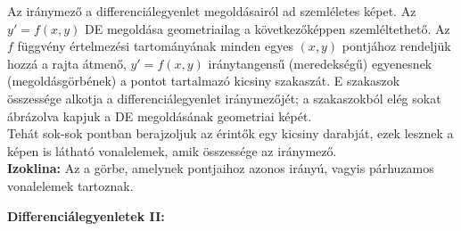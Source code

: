 \documentclass[11pt,a4paper]{article}
\begin{document}
    \begin{tcolorbox}[colback=red!5!white,colframe=red!60!black,title= 6. Iránymező]
        Az iránymező a differenciálegyenlet megoldásairól ad szemléletes képet. Az $y' = f(x,y)$ DE megoldása geometriailag a következőképpen szemléltethető. Az $f$ függvény értelmezési tartományának minden egyes $(x,y)$ pontjához rendeljük hozzá a rajta átmenő, $y' = f(x,y)$ iránytangensű (meredekségű) egyenesnek (megoldásgörbének) a pontot tartalmazó kicsiny szakaszát. E szakaszok összessége alkotja a differenciálegyenlet iránymezőjét; a szakaszokból elég sokat ábrázolva kapjuk a DE megoldásának geometriai képét.\\
        Tehát sok-sok pontban berajzoljuk az érintők egy kicsiny darabját, ezek lesznek a képen is látható vonalelemek, amik összessége az iránymező.\\
        \textbf{Izoklina:} Az a görbe, amelynek pontjaihoz azonos irányú, vagyis párhuzamos vonalelemek tartoznak.
        \begin{center}
        \end{center}
    \end{tcolorbox}
\newpage
\textbf{Differenciálegyenletek II:}    
\end{document}
